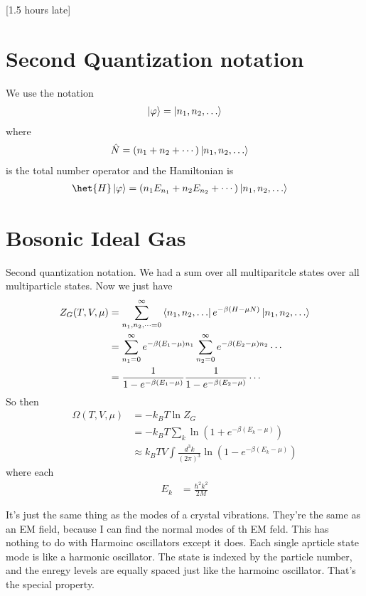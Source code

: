 [1.5 hours late]
\section{Second Quantization notation}
We use the notation
\begin{align}
    \ket{\varphi} = \ket{n_1, n_2, \ldots}
\end{align}
where
\begin{align}
    \hat{N} &=
    \left( n_1 + n_2 + \cdots \right)
    \ket{n_1, n_2, \ldots}
\end{align}
is the total number operator and the Hamiltonian is
\begin{align}
    \het{H} \ket{\varphi} &=
    \left( 
    n_1 E_{n_1} + n_2 E_{n_2} + \cdots
    \right)
    \ket{n_1, n_2, \ldots}
\end{align}

\section{Bosonic Ideal Gas}
Second quantization notation.
We had a sum over all multiparitcle states over all multiparticle states.
Now we just have
\begin{align}
    Z_G(T, V, \mu) &=
    \sum_{n_1, n_2, \cdots = 0}^{\infty}
    \bra{n_1,n_2,\ldots} e^{-\beta(H - \mu N)} \ket{n_1,n_2,\ldots}\\
    &=
    \sum_{n_1=0}^{\infty} e^{-\beta(E_1 - \mu) n_1}
    \sum_{n_2=0}^{\infty} e^{-\beta(E_2 - \mu) n_2}
    \cdots\\
    &=
    \frac{1}{1 - e^{-\beta(E_1 - \mu)}}
    \frac{1}{1 - e^{-\beta(E_2 - \mu)}}
    \cdots
\end{align}
So then
\begin{align}
    \Omega(T, V, \mu) &=
    -k_B T \ln Z_G\\
    &=
    -k_BT \sum_k \ln\left( 1 + e^{-\beta (E_k - \mu)} \right)\\
    &\approx
    k_B TV \int \frac{d^3k}{(2\pi)^3}
    \ln\left( 1 - e^{-\beta(E_k - \mu)} \right)
\end{align}
where each
\begin{align}
    E_k &= \frac{\hbar^2 k^2}{2M}
\end{align}

It's just the same thing as the modes of a crystal vibrations.
They're the same as an EM field,
because I can find the normal modes of th EM feld.
This has nothing to do with Harmoinc oscillators except it does.
Each single aprticle state mode is like a harmonic oscillator.
The state is indexed by the particle number,
and the enregy levels are equally spaced just like the harmoinc oscillator.
That's the special property.

